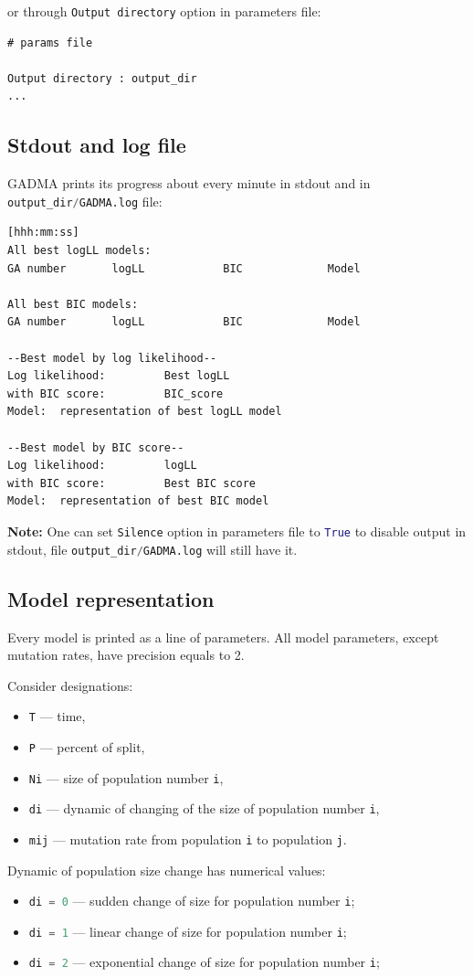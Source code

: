 \documentclass[12pt]{article}
\makeatletter
\newcommand{\py}[1]{\lstinline[language=Python, showstringspaces=False]@#1@}
\makeatother
\begin{document}
or through \py{Output directory} option in parameters file:
\begin{lstlisting}
# params file

Output directory : output_dir
...
\end{lstlisting}

\subsection{Stdout and log file}
GADMA prints its progress about every minute in stdout and in \py{output_dir/GADMA.log} file:

\begin{lstlisting}
[hhh:mm:ss]
All best logLL models:
GA number       logLL            BIC             Model

All best BIC models:
GA number       logLL            BIC             Model

--Best model by log likelihood--
Log likelihood:       	Best logLL
with BIC score:         BIC_score
Model: 	representation of best logLL model

--Best model by BIC score--
Log likelihood:       	logLL
with BIC score:         Best BIC score
Model:  representation of best BIC model 
\end{lstlisting}
 
\textbf{Note: } One can set \py{Silence} option in parameters file to \py{True} to disable output in stdout, file \py{output_dir/GADMA.log} will still have it.

\subsection{Model representation}
Every model is printed as a line of parameters. All model parameters, except mutation rates, have precision equals to 2.

Consider designations:
\begin{itemize}
    \item \py{T} --- time,
    \item \py{P} --- percent of split,
    \item \py{Ni} --- size of population number \py{i},
    \item \py{di} --- dynamic of changing of the size of population number \py{i},
    \item \py{mij} --- mutation rate from population \py{i} to population \py{j}.
\end{itemize}

Dynamic of population size change has numerical values: 
\begin{itemize}
    \item \py{di = 0} --- sudden change of size for population number \py{i};
    \item \py{di = 1} --- linear change of size for population number \py{i};
    \item \py{di = 2} --- exponential change of size for population number \py{i};
\end{itemize}
\end{document}
